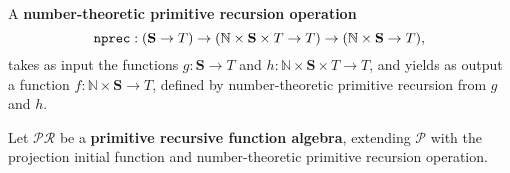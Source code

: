 \begin{definition} A \textbf{number-theoretic primitive recursion operation}
%
$$\mathtt{nprec} : {\mathopen{}\left({\mathbf{S} \rightarrow T}\right)\mathclose{}} \rightarrow {\ensuremath{\mathopen{}\left({\mathbb{N}
\times \mathbf{S} \times T \rightarrow T}\right)\mathclose{}}} \rightarrow {\ensuremath{\mathopen{}\left({\mathbb{N} \times
\mathbf{S} \rightarrow T}\right)\mathclose{}}},$$
%
takes as input the functions $g : \mathbf{S} \rightarrow T$ and $h : \mathbb{N}
\times \mathbf{S} \times T \rightarrow T$, and yields as output a function $f :
\mathbb{N} \times \mathbf{S} \rightarrow T$, defined by number-theoretic
primitive recursion from $g$ and $h$.\end{definition}

\begin{definition} Let $\mathcal{PR}$ be a \textbf{primitive recursive function
algebra}, extending $\mathcal{P}$ with the projection initial function and
number-theoretic primitive recursion operation.\end{definition}











